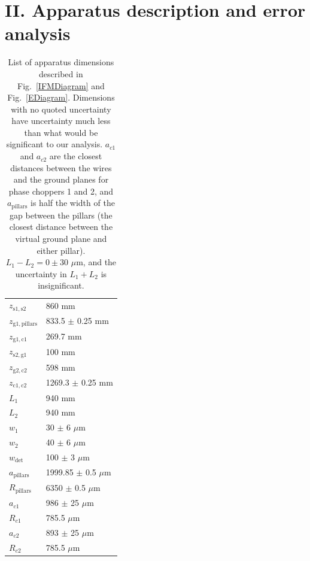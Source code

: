 \documentclass[twocolumn,prl,showpacs,superscriptaddress,longbibliography]{revtex4-1}   %
\newcommand{\figref}[1]{Fig.~\ref{#1}}
\begin{document}


\section{II. Apparatus description and error analysis}

\begingroup
\begin{table}
\caption{\label{tableDimensions}List of apparatus dimensions described in \figref{IFMDiagram} and \figref{EDiagram}. Dimensions with no quoted uncertainty have uncertainty much less than what would be significant to our analysis.
$a_{c1}$ and $a_{c2}$ are the closest distances between the wires and the ground planes for phase choppers 1 and 2, and $a_{\mathrm{pillars}}$ is half the width of the gap between the pillars (the closest distance between the virtual ground plane and either pillar). $L_1-L_2 = 0 \pm 30$ $\mu$m, and the uncertainty in $L_1 + L_2$ is insignificant.}
\begin{center}
\begin{tabular}{l l}
\hline\hline
$z_{\mathrm{s1,s2}}$ & 860 mm \\
$z_{\mathrm{g1,pillars}}$ & 833.5 $\pm$ 0.25 mm \\
$z_{\mathrm{g1,c1}}$ & 269.7 mm \\
$z_{\mathrm{s2,g1}}$ & 100 mm \\
$z_{\mathrm{g2,c2}}$ & 598 mm \\
$z_{\mathrm{c1,c2}}$ & 1269.3 $\pm$ 0.25 mm \\
$L_1$ & 940 mm \\
$L_2$ & 940 mm \\
$w_1$ & 30 $\pm$ 6 $\mu$m \\
$w_2$ & 40 $\pm$ 6 $\mu$m \\
$w_{\mathrm{det}}$ & 100 $\pm$ 3 $\mu$m \\ 
$a_{\mathrm{pillars}}$ & 1999.85 $\pm$ 0.5 $\mu$m \\
$R_{\mathrm{pillars}}$ & 6350 $\pm$ 0.5 $\mu$m \\
$a_{c1}$ & 986 $\pm$ 25 $\mu$m \\
$R_{c1}$ & 785.5 $\mu$m \\
$a_{c2}$ & 893 $\pm$ 25 $\mu$m \\
$R_{c2}$ & 785.5 $\mu$m \\
\hline\hline
\end{tabular}
\end{center}
\end{table}
\endgroup
\end{document}
